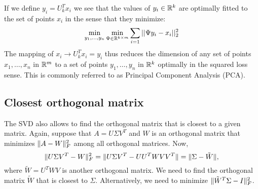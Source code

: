\documentclass{article}
\begin{document}
If we define $y_i = U_{k}^{T}x_{i}$ we see that the values of $y_i \in {\mathbb{R}}^{k}$ are optimally fitted to the set of points $x_i$ in the 
sense that they minimize:
\[
\min_{y_1,\ldots,y_n } \min_{\Psi \in {\mathbb{R}}^{k \times m}}\sum_{i=1} ||\Psi y_i - x_{i}||_{2}^{2}
\] 
The mapping of $x_i \rightarrow  U_{k}^{T}x_i = y_i $ thus reduces the dimension of any set of points  $x_1,\ldots,x_n$ in ${\mathbb{R}}^{m}$ to 
a set of points $y_1,\ldots,y_n$ in ${\mathbb{R}}^{k}$ optimally in the squared loss sense. This is commonly referred to as Principal Component Analysis (PCA).

\subsection*{Closest orthogonal matrix}
The SVD also allows to find the orthogonal matrix that is closest to
a given matrix. Again, suppose that $A = U \Sigma V^{T}$ and $W$ is
an orthogonal matrix that minimizes $\| A-W \|^{2}_{F}$ among all
orthogonal matrices. Now,
\begin{equation*}
\| U \Sigma V^{T} - W \|_{F}^{2} = \| U \Sigma V^{T} - UU^{T} W
VV^{T} \| = \| \Sigma - \tilde{W} \|,
\end{equation*}
where $\tilde{W}=U^{T} W V$ is another orthogonal matrix. We need to
find the orthogonal matrix $\tilde{W}$ that is closest to $\Sigma$.
Alternatively, we need to minimize $\| \tilde{W}^{T} \Sigma -
I \|_{F}^{2}$.
\end{document}
